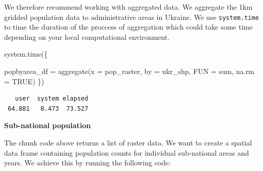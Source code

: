 \documentclass[
  letterpaper,
  DIV=11,
  numbers=noendperiod]{scrreprt}
\newenvironment{Shaded}{\begin{snugshade}}{\end{snugshade}}
\newcommand{\AttributeTok}[1]{\textcolor[rgb]{0.40,0.45,0.13}{#1}}
\newcommand{\ConstantTok}[1]{\textcolor[rgb]{0.56,0.35,0.01}{#1}}
\newcommand{\FunctionTok}[1]{\textcolor[rgb]{0.28,0.35,0.67}{#1}}
\newcommand{\NormalTok}[1]{\textcolor[rgb]{0.00,0.23,0.31}{#1}}
\newcommand{\OtherTok}[1]{\textcolor[rgb]{0.00,0.23,0.31}{#1}}
\begin{document}
We therefore recommend working with aggregated data. We aggregate the
1km gridded population data to administrative areas in Ukraine. We use
\texttt{system.time} to time the duration of the proccess of aggregation
which could take some time depending on your local computational
environment.

\begin{Shaded}
\begin{Highlighting}[]
\FunctionTok{system.time}\NormalTok{(\{}

\NormalTok{popbyarea\_df }\OtherTok{=} \FunctionTok{aggregate}\NormalTok{(}\AttributeTok{x =}\NormalTok{ pop\_raster, }
                                   \AttributeTok{by =}\NormalTok{ ukr\_shp, }
                                   \AttributeTok{FUN =}\NormalTok{ sum, }
                                   \AttributeTok{na.rm =} \ConstantTok{TRUE}\NormalTok{) }
\NormalTok{\})}
\end{Highlighting}
\end{Shaded}

\begin{verbatim}
   user  system elapsed 
 64.881   8.473  73.527 
\end{verbatim}

\textbf{Sub-national population}

The chunk code above returns a list of raster data. We want to create a
spatial data frame containing population counts for individual
sub-national areas and years. We achieve this by running the following
code:
\end{document}
